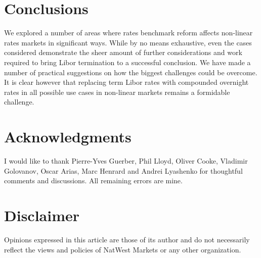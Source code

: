 \documentclass{article}
\begin{document}
\section{Conclusions}

We explored a number of areas where rates benchmark reform affects
non-linear rates markets in significant ways. While by no means exhaustive,
even the cases considered demonstrate the sheer amount of further
considerations and work required to bring Libor termination to a successful
conclusion. We have made a number of practical suggestions on how the
biggest challenges could be overcome. It is clear however that replacing
term Libor rates with compounded overnight rates in all possible use cases
in non-linear markets remains a formidable challenge.

\section*{Acknowledgments}

I would like to thank Pierre-Yves Guerber, Phil Lloyd, Oliver Cooke,
Vladimir Golovanov, Oscar Arias, Marc Henrard and Andrei Lyashenko for
thoughtful comments and discussions. All remaining errors are mine.

\section*{Disclaimer}

Opinions expressed in this article are those of its author and do not
necessarily reflect the views and policies of NatWest Markets or any other
organization.
\end{document}
